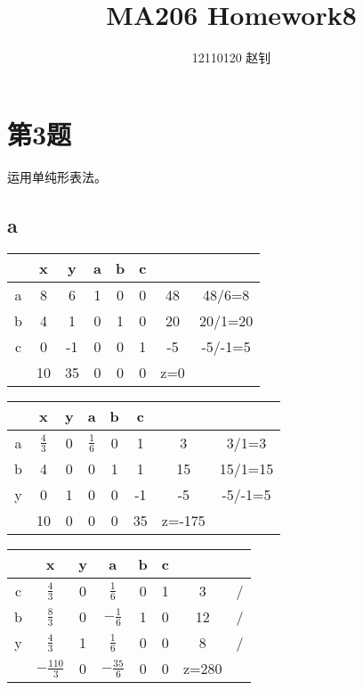 \documentclass{article}
\title{MA206 Homework8}
\author{12110120 赵钊}
\date{}
\begin{document}
\maketitle


\section{第3题}
运用单纯形表法。

\subsection{a}
\begin{table}[!ht]
    \centering
    \begin{tabular}{|c|c|c|c|c|c|c|c|}
    \hline
         & x & y & a & b & c &  &  \\ \hline
        a & 8 & 6 & 1 & 0 & 0 & 48 & 48/6=8 \\ \hline
        b & 4 & 1 & 0 & 1 & 0 & 20 & 20/1=20 \\ \hline
        c & 0 & -1 & 0 & 0 & 1 & -5 & -5/-1=5 \\ \hline
         & 10 & 35 & 0 & 0 & 0 & z=0 &  \\ \hline
    \end{tabular}
\end{table}

\begin{table}[!ht]
    \centering
    \begin{tabular}{|c|c|c|c|c|c|c|c|}
    \hline
         & x & y & a & b & c &  &  \\ \hline
        a & $\frac{4}{3}$ & 0 & $\frac{1}{6}$ & 0 & 1 & 3 & 3/1=3 \\ \hline
        b & 4 & 0 & 0 & 1 & 1 & 15 & 15/1=15 \\ \hline
        y & 0 & 1 & 0 & 0 & -1 & -5 & -5/-1=5 \\ \hline
         & 10 & 0 & 0 & 0 & 35 & z=-175 &  \\ \hline
    \end{tabular}
\end{table}

\begin{table}[!ht]
    \centering
    \begin{tabular}{|c|c|c|c|c|c|c|c|}
    \hline
         & x & y & a & b & c &  &  \\ \hline
        c & $\frac{4}{3}$ & 0 & $\frac{1}{6}$ & 0 & 1 & 3 & / \\ \hline
        b & $\frac{8}{3}$ & 0 & $-\frac{1}{6}$ & 1 & 0 & 12 & / \\ \hline
        y & $\frac{4}{3}$ & 1 & $\frac{1}{6}$ & 0 & 0 & 8 & / \\ \hline
         & $-\frac{110}{3}$ & 0 & $-\frac{35}{6}$ & 0 & 0 & z=280 &  \\ \hline
    \end{tabular}
\end{table}
\end{document}
